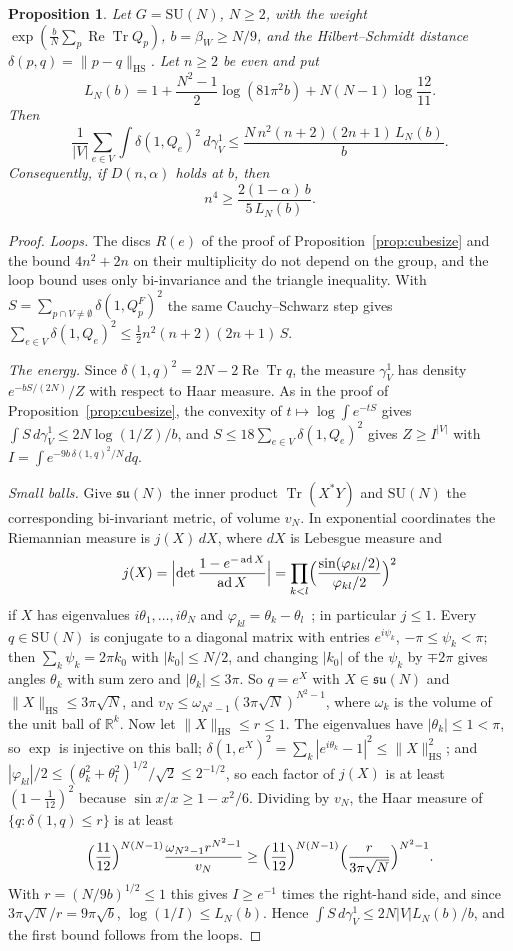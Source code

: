 \documentclass[aps,prd,twocolumn,superscriptaddress,nofootinbib,longbibliography,floatfix,amsmath,amssymb,10pt]{revtex4-2}
\newtheorem{proposition}[theorem]{Proposition}
\theoremstyle{definition}
\theoremstyle{remark}
\newcommand{\R}{\mathbb{R}}
\newcommand{\SU}{\mathrm{SU}}
\newcommand{\Tr}{\operatorname{Tr}}
\newcommand{\ReTr}{\operatorname{Re}\operatorname{Tr}}
\begin{document}
\begin{proposition}\label{prop:cubesizeN}
Let $G=\SU(N)$, $N\ge2$, with the weight $\exp(\frac{b}N\sum_p\ReTr Q_p)$,
$b=\beta_W\ge N/9$, and the Hilbert--Schmidt distance
$\delta(p,q)=\|p-q\|_{\mathrm{HS}}$. Let $n\ge2$ be even and put
\[
L_N(b)=1+\frac{N^2-1}2\log(81\pi^2b)+N(N-1)\log\frac{12}{11} .
\]
Then
\[
\frac1{|V|}\sum_{e\in V}\int\delta(1,Q_e)^2\,d\gamma^1_V\le
\frac{N\,n^2(n+2)(2n+1)\,L_N(b)}b .
\]
Consequently, if $D(n,\alpha)$ holds at $b$, then
\[
n^4\ge\frac{2(1-\alpha)\,b}{5\,L_N(b)} .
\]
\end{proposition}

\begin{proof}
\emph{Loops.} The discs $R(e)$ of the proof of
Proposition~\ref{prop:cubesize} and the bound $4n^2+2n$ on their multiplicity
do not depend on the group, and the loop bound uses only bi-invariance and the
triangle inequality. With $S=\sum_{p\cap V\ne\emptyset}\delta(1,Q^F_p)^2$ the
same Cauchy--Schwarz step gives
$\sum_{e\in V}\delta(1,Q_e)^2\le\frac12n^2(n+2)(2n+1)\,S$.

\emph{The energy.} Since $\delta(1,q)^2=2N-2\ReTr q$, the measure $\gamma^1_V$
has density $e^{-bS/(2N)}/Z$ with respect to Haar measure. As in the proof of
Proposition~\ref{prop:cubesize}, the convexity of $t\mapsto\log\int e^{-tS}$
gives $\int S\,d\gamma^1_V\le2N\log(1/Z)/b$, and $S\le18\sum_{e\in V}
\delta(1,Q_e)^2$ gives $Z\ge I^{|V|}$ with $I=\int e^{-9b\,\delta(1,q)^2/N}dq$.

\emph{Small balls.} Give $\mathfrak{su}(N)$ the inner product
$\Tr(X^*Y)$ and $\SU(N)$ the corresponding bi-invariant metric, of volume
$v_N$. In exponential coordinates the Riemannian measure is $j(X)\,dX$, where
$dX$ is Lebesgue measure and
\[
j(X)=\Bigl|\det\frac{1-e^{-\operatorname{ad}X}}{\operatorname{ad}X}\Bigr|
=\prod_{k<l}\Bigl(\frac{\sin(\varphi_{kl}/2)}{\varphi_{kl}/2}\Bigr)^2
\]
if $X$ has eigenvalues $i\theta_1,\dots,i\theta_N$ and
$\varphi_{kl}=\theta_k-\theta_l$~\cite[Ch.~II,
Thm.~1.7]{Hel01}; in particular $j\le1$. Every $q\in\SU(N)$ is conjugate to a
diagonal matrix with entries $e^{i\psi_k}$, $-\pi\le\psi_k<\pi$; then
$\sum_k\psi_k=2\pi k_0$ with $|k_0|\le N/2$, and changing $|k_0|$ of the
$\psi_k$ by $\mp2\pi$ gives angles $\theta_k$ with sum zero and
$|\theta_k|\le3\pi$. So $q=e^X$ with $X\in\mathfrak{su}(N)$ and
$\|X\|_{\mathrm{HS}}\le3\pi\sqrt N$, and
$v_N\le\omega_{N^2-1}(3\pi\sqrt N)^{N^2-1}$, where $\omega_k$ is the volume
of the unit ball of $\R^k$. Now let $\|X\|_{\mathrm{HS}}\le r\le1$. The
eigenvalues have $|\theta_k|\le1<\pi$, so $\exp$ is injective on this ball;
$\delta(1,e^X)^2=\sum_k|e^{i\theta_k}-1|^2\le\|X\|_{\mathrm{HS}}^2$; and
$|\varphi_{kl}|/2\le(\theta_k^2+\theta_l^2)^{1/2}/\sqrt2\le2^{-1/2}$, so each
factor of $j(X)$ is at least $(1-\frac1{12})^2$ because $\sin x/x\ge1-x^2/6$.
Dividing by $v_N$, the Haar measure of $\{q:\delta(1,q)\le r\}$ is at least
\[
\Bigl(\frac{11}{12}\Bigr)^{N(N-1)}\frac{\omega_{N^2-1}r^{N^2-1}}{v_N}\ge
\Bigl(\frac{11}{12}\Bigr)^{N(N-1)}\Bigl(\frac r{3\pi\sqrt N}\Bigr)^{N^2-1}.
\]
With $r=(N/9b)^{1/2}\le1$ this gives $I\ge e^{-1}$ times the right-hand side,
and since $3\pi\sqrt N/r=9\pi\sqrt b$, $\log(1/I)\le L_N(b)$. Hence
$\int S\,d\gamma^1_V\le2N|V|L_N(b)/b$, and the first bound follows from the
loops.


\end{proof}
\end{document}
